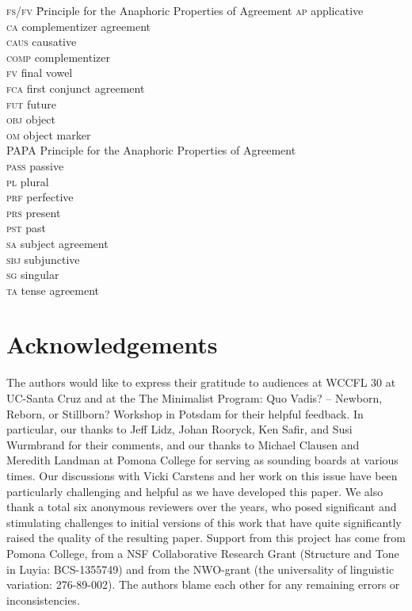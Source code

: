 \begin{multicols}{2}
	\begin{tabbing}
		\textsc{fs/fv}\hspace{5mm} \= Principle for the Anaphoric Properties of Agreement\kill
\textsc{ap} \> applicative \\ 
\textsc{ca} \> complementizer agreement \\ 
\textsc{caus} \> causative \\ 
\textsc{comp} \> complementizer \\
\textsc{fv} \> final vowel \\ 
\textsc{fca} \> first conjunct agreement \\
\textsc{fut} \> future \\
\textsc{obj} \> object \\
\textsc{om} \> object marker \\
PAPA \> Principle for the Anaphoric Properties of Agreement \\
\textsc{pass} \> passive \\
\textsc{pl} \> plural \\
\textsc{prf} \> perfective \\ 
\textsc{prs} \> present \\ 
\textsc{pst} \> past \\ 
\textsc{sa} \> subject agreement \\ 
\textsc{sbj} \> subjunctive \\
\textsc{sg} \> singular \\
\textsc{ta} \> tense agreement \\
\end{tabbing}
\end{multicols}

\section*{Acknowledgements}
The authors would like to express their gratitude to audiences at WCCFL 30 at UC-Santa Cruz and at the The Minimalist Program: Quo Vadis? – Newborn, Reborn, or Stillborn? Workshop in Potsdam for their helpful feedback. In particular, our thanks to Jeff Lidz, Johan Rooryck, Ken Safir, and Susi Wurmbrand for their comments, and our thanks to Michael Clausen and Meredith Landman at Pomona College for serving as sounding boards at various times. Our discussions with Vicki Carstens and her work on this issue have been particularly challenging and helpful as we have developed this paper. We also thank a total six anonymous reviewers over the years, who posed significant and stimulating challenges to initial versions of this work that have quite significantly raised the quality of the resulting paper. Support from this project has come from Pomona College, from a NSF Collaborative Research Grant (Structure and Tone in Luyia: BCS-1355749) and from the NWO-grant (the universality of linguistic variation: 276-89-002). The authors blame each other for any remaining errors or inconsistencies.



{\sloppy
	\printbibliography[heading=subbibliography,notkeyword=this]
}


